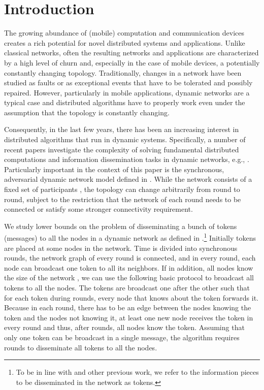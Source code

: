 \documentclass{llncs}
\begin{document}
\section{Introduction}

The growing abundance of (mobile) computation and communication
devices creates a rich potential for novel distributed systems and
applications. Unlike classical networks, often the resulting networks
and applications are characterized by a high level of churn and,
especially in the case of mobile devices, a potentially constantly
changing topology. Traditionally, changes in a network have been
studied as faults or as exceptional events that have to be tolerated
and possibly repaired. However, particularly in mobile applications,
dynamic networks are a typical case and distributed algorithms
have to properly work even under the assumption that the topology is constantly changing.

Consequently, in the last few years, there has been an increasing
interest in distributed algorithms that run in dynamic
systems. Specifically, a number of recent papers investigate the
complexity of solving fundamental distributed computations and
information dissemination tasks in dynamic networks, e.g.,
\cite{avin08,baumann09,clementi08,clementi09,cornejo12,LBarxiv,odell05,HK,KLO,KMO,KOSurvey}.
Particularly important in the context of this paper is the
synchronous, adversarial dynamic network model defined in
\cite{KLO}. While the network consists of a fixed set of participants
, the topology can change arbitrarily from round to round, subject
to the restriction that the network of each round needs to be
connected or satisfy some stronger connectivity requirement.

We study lower bounds on the problem of disseminating a
bunch of tokens (messages) to all the nodes in a dynamic network as
defined in \cite{KLO}.\footnote{To be in line with \cite{KLO} and
    other previous work, we refer to the information pieces to be
    disseminated in the network as tokens.} Initially  tokens are
placed at some nodes in the network. 
Time is divided into
synchronous rounds, the network graph of every round is connected, and
in every round, each node can broadcast one token to all its
neighbors. If in addition, all nodes know the size of the network ,
we can use the following basic protocol to broadcast all  tokens to
all the nodes. The tokens are broadcast one after the other such that
for each token during  rounds, every node that knows about the
token forwards it. Because in each round, there has to be an edge
between the nodes knowing the token and the nodes not knowing it, at
least one new node receives the token in every round and thus, after
 rounds, all nodes know the token. Assuming that only one token
can be broadcast in a single message, the algorithm requires 
rounds to disseminate all  tokens to all the nodes.
\end{document}
